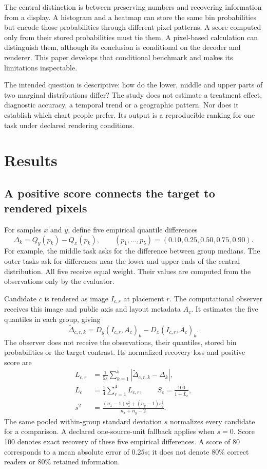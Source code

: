 \documentclass[11pt]{article}
\begin{document}
The central distinction is between preserving numbers and recovering information from a display. A histogram and a heatmap can store the same bin probabilities but encode those probabilities through different pixel patterns. A score computed only from their stored probabilities must tie them. A pixel-based calculation can distinguish them, although its conclusion is conditional on the decoder and renderer. This paper develops that conditional benchmark and makes its limitations inspectable.

The intended question is descriptive: how do the lower, middle and upper parts of two marginal distributions differ? The study does not estimate a treatment effect, diagnostic accuracy, a temporal trend or a geographic pattern. Nor does it establish which chart people prefer. Its output is a reproducible ranking for one task under declared rendering conditions.

\section*{Results}
\subsection*{A positive score connects the target to rendered pixels}
For samples $x$ and $y$, define five empirical quantile differences
\begin{equation}
\Delta_k=Q_y(p_k)-Q_x(p_k),\qquad (p_1,\ldots,p_5)=(0.10,0.25,0.50,0.75,0.90).
\label{eq:target}
\end{equation}
For example, the middle task asks for the difference between group medians. The outer tasks ask for differences near the lower and upper ends of the central distribution. All five receive equal weight. Their values are computed from the observations only by the evaluator.

Candidate $c$ is rendered as image $I_{c,r}$ at placement $r$. The computational observer receives this image and public axis and layout metadata $A_c$. It estimates the five quantiles in each group, giving
\begin{equation}
\widetilde\Delta_{c,r,k}=D_y(I_{c,r},A_c)_k-D_x(I_{c,r},A_c)_k.
\end{equation}
The observer does not receive the observations, their quantiles, stored bin probabilities or the target contrast. Its normalized recovery loss and positive score are
\begin{align}
L_{c,r}&=\frac{1}{5s}\sum_{k=1}^{5}|\widetilde\Delta_{c,r,k}-\Delta_k|,\\
\overline L_c&=\frac14\sum_{r=1}^{4}L_{c,r},\qquad
S_c=\frac{100}{1+\overline L_c},\label{eq:score}\\
s^2&=\frac{(n_x-1)s_x^2+(n_y-1)s_y^2}{n_x+n_y-2}.
\end{align}
The same pooled within-group standard deviation $s$ normalizes every candidate for a comparison. A declared one-source-unit fallback applies when $s=0$. Score 100 denotes exact recovery of these five empirical differences. A score of 80 corresponds to a mean absolute error of $0.25s$; it does not denote 80\% correct readers or 80\% retained information.
\end{document}
